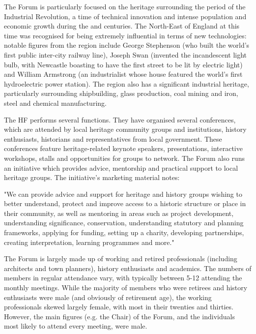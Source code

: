 The Forum is particularly focused on the heritage surrounding the period of the Industrial Revolution, a time of technical innovation and intense population and economic growth during the  and  centuries. The North-East of England at this time was recognised for being extremely influential in terms of new technologies: notable figures from the region include George Stephenson (who built the world's first public inter-city railway line), Joseph Swan (invented the incandescent light bulb, with Newcastle boasting to have the first street to be lit by electric light) and William Armstrong (an industrialist whose house featured the world's first hydroelectric power station). The region also has a significant industrial heritage, particularly surrounding shipbuilding, glass production, coal mining and iron, steel and chemical manufacturing. 

The HF performs several functions. They have organised several conferences, which are attended by local heritage community groups and institutions, history enthusiasts, historians and representatives from local government. These conferences feature heritage-related keynote speakers, presentations, interactive workshops, stalls and opportunities for groups to network. The Forum also runs an initiative which provides advice, mentorship and practical support to local heritage groups. The initiative's marketing material notes:

\begin{displayquote}
"We can provide advice and support for heritage and history groups wishing to better understand, protect and improve access to a historic structure or place in their community, as well as mentoring in areas such as project development, understanding significance, conservation, understanding statutory and planning frameworks, applying for funding, setting up a charity, developing partnerships, creating interpretation, learning programmes and more."
\end{displayquote}

The Forum is largely made up of working and retired professionals (including architects and town planners), history enthusiasts and academics. The numbers of members in regular attendance vary, with typically between 5-12 attending the monthly meetings. While the majority of members who were retirees and history enthusiasts were male (and obviously of retirement age), the working professionals skewed largely female, with most in their twenties and thirties. However, the main figures (e.g. the Chair) of the Forum, and the individuals most likely to attend every meeting, were male.

